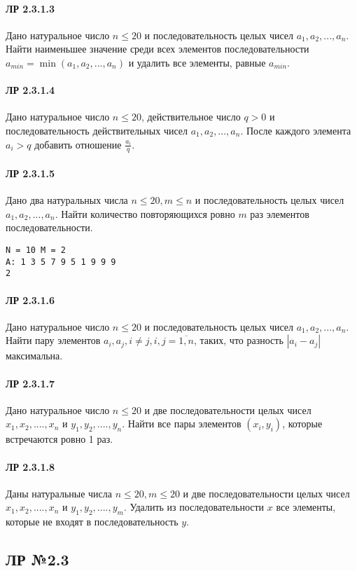 \documentclass[12pt,a4paper]{report}
\begin{document}
\paragraph*{ЛР 2.3.1.3} Дано натуральное число $n \le 20$ и последовательность целых чисел $a_1, a_2, ..., a_n$. Найти наименьшее значение среди всех элементов последовательности $a_{min} = \min(a_1, a_2, ..., a_n)$ и удалить все элементы, равные $a_{min}$.
\paragraph*{ЛР 2.3.1.4} Дано натуральное число $n \le 20$, действительное число $q>0$ и последовательность действительных чисел $a_1, a_2, ..., a_n$. После каждого элемента $a_i > q$ добавить отношение $\frac {a_i}{q}$.
\paragraph*{ЛР 2.3.1.5} Дано два натуральных числа $n \le 20, m \le n$ и последовательность целых чисел $a_1, a_2, ..., a_n$. Найти количество повторяющихся ровно $m$ раз элементов последовательности.
\begin{verbatim}
N = 10 M = 2
A: 1 3 5 7 9 5 1 9 9 9
2
\end{verbatim}
\paragraph*{ЛР 2.3.1.6} Дано натуральное число $n \le 20$ и последовательность целых чисел $a_1, a_2, ..., a_n$. Найти пару элементов $a_i, a_j, i \ne j, i,j=\overline{1,n}$, таких, что разность $|a_i-a_j|$ максимальна.
\paragraph*{ЛР 2.3.1.7} Дано натуральное число $n \le 20$ и две последовательности целых чисел $x_1, x_2, ...., x_n$ и $y_1, y_2, ...., y_n$. Найти все пары элементов $(x_i, y_i)$, которые встречаются ровно 1 раз.
\paragraph*{ЛР 2.3.1.8} Даны натуральные числа $n \le 20, m \le 20$ и две последовательности целых чисел $x_1, x_2, ...., x_n$ и $y_1, y_2, ...., y_m$. Удалить из последовательности $x$ все элементы, которые не входят в последовательность $y$.

\clearpage
\subsection*{ЛР №2.3}
\end{document}
